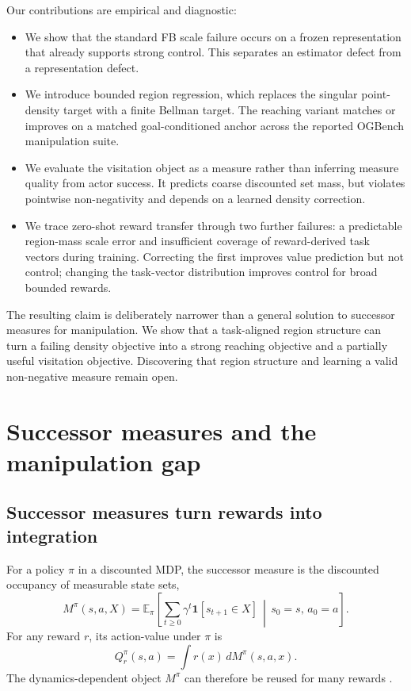 \documentclass{article}
\newcommand{\E}{\mathbb{E}}
\newcommand{\ind}[1]{\mathbf{1}\!\left[#1\right]}
\begin{document}
Our contributions are empirical and diagnostic:
\begin{itemize}
    \item We show that the standard FB scale failure occurs on a frozen
    representation that already supports strong control. This separates an
    estimator defect from a representation defect.
    \item We introduce bounded region regression, which replaces the singular
    point-density target with a finite Bellman target. The reaching variant
    matches or improves on a matched goal-conditioned anchor across the reported
    OGBench manipulation suite.
    \item We evaluate the visitation object as a measure rather than inferring
    measure quality from actor success. It predicts coarse discounted set mass,
    but violates pointwise non-negativity and depends on a learned density
    correction.
    \item We trace zero-shot reward transfer through two further failures: a
    predictable region-mass scale error and insufficient coverage of
    reward-derived task vectors during training. Correcting the first improves
    value prediction but not control; changing the task-vector distribution
    improves control for broad bounded rewards.
\end{itemize}

The resulting claim is deliberately narrower than a general solution to
successor measures for manipulation. We show that a task-aligned region structure
can turn a failing density objective into a strong reaching objective and a
partially useful visitation objective. Discovering that region structure and
learning a valid non-negative measure remain open.

\section{Successor measures and the manipulation gap}
\label{sec:background}

\subsection{Successor measures turn rewards into integration}

For a policy $\pi$ in a discounted MDP, the successor measure is the discounted
occupancy of measurable state sets,
\begin{equation}
\label{eq:sm}
M^{\pi}(s,a,X)
=
\E_{\pi}\!\left[
\sum_{t\ge 0}\gamma^{t}\ind{s_{t+1}\in X}
\,\middle|\,
s_{0}=s,\,a_{0}=a
\right].
\end{equation}
For any reward $r$, its action-value under $\pi$ is
\begin{equation}
Q_r^{\pi}(s,a)=\int r(x)\,dM^{\pi}(s,a,x).
\end{equation}
The dynamics-dependent object $M^{\pi}$ can therefore be reused for many rewards
\citep{dayan1993improving,blier2021learning}.
\end{document}
